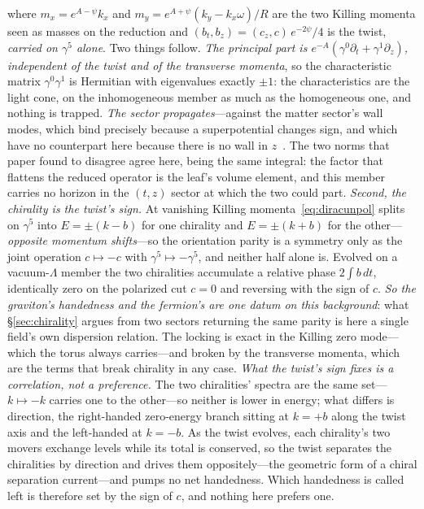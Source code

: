 \documentclass[11pt,a4paper]{article}
\theoremstyle{plain}
\theoremstyle{definition}
\theoremstyle{remark}
\begin{document}
where $m_x=e^{A-\psi}k_x$ and $m_y=e^{A+\psi}(k_y-k_x\omega)/R$ are the two Killing momenta seen as masses on the reduction and $(b_t,b_z)=(c_z,c)\,e^{-2\psi}/4$ is the twist, \emph{carried on $\gamma^5$ alone}. Two things follow. \emph{The principal part is $e^{-A}(\gamma^0\partial_t+\gamma^1\partial_z)$, independent of the twist and of the transverse momenta}, so the characteristic matrix $\gamma^0\gamma^1$ is Hermitian with eigenvalues exactly $\pm1$: the characteristics are the light cone, on the inhomogeneous member as much as the homogeneous one, and nothing is trapped. \emph{The sector propagates}---against the matter sector's wall modes, which bind precisely because a superpotential changes sign, and which have no counterpart here because there is no wall in $z$~\cite{JanzenMatter}. The two norms that paper found to disagree agree here, being the same integral: the factor that flattens the reduced operator is the leaf's volume element, and this member carries no horizon in the $(t,z)$ sector at which the two could part. \emph{Second, the chirality is the twist's sign.} At vanishing Killing momenta~\eqref{eq:diracunpol} splits on $\gamma^5$ into $E=\pm(k-b)$ for one chirality and $E=\pm(k+b)$ for the other---\emph{opposite momentum shifts}---so the orientation parity is a symmetry only as the joint operation $c\mapsto-c$ with $\gamma^5\mapsto-\gamma^5$, and neither half alone is. Evolved on a vacuum-$\Lambda$ member the two chiralities accumulate a relative phase $2\!\int\! b\,dt$, identically zero on the polarized cut $c=0$ and reversing with the sign of $c$. \emph{So the graviton's handedness and the fermion's are one datum on this background}: what \S\ref{sec:chirality} argues from two sectors returning the same parity is here a single field's own dispersion relation. The locking is exact in the Killing zero mode---which the torus always carries---and broken by the transverse momenta, which are the terms that break chirality in any case. \emph{What the twist's sign fixes is a correlation, not a preference.} The two chiralities' spectra are the same set---$k\mapsto-k$ carries one to the other---so neither is lower in energy; what differs is direction, the right-handed zero-energy branch sitting at $k=+b$ along the twist axis and the left-handed at $k=-b$. As the twist evolves, each chirality's two movers exchange levels while its total is conserved, so the twist separates the chiralities by direction and drives them oppositely---the geometric form of a chiral separation current---and pumps no net handedness. Which handedness is called left is therefore set by the sign of $c$, and nothing here prefers one.
\end{document}

